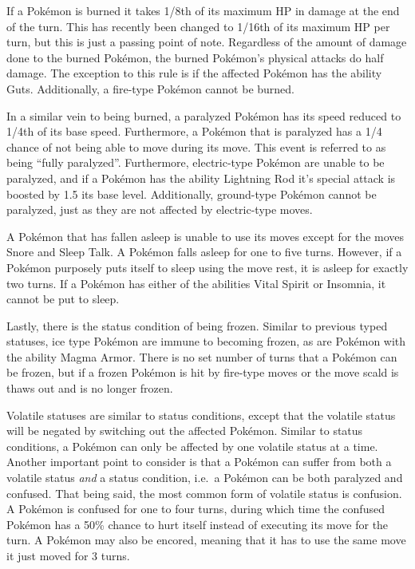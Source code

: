 \documentclass[12pt,twoside]{reedthesis}
\begin{document}
  If a Pokémon is burned it takes 1/8th of its maximum HP in damage at the
  end of the turn. This has recently been changed to 1/16th of its maximum
  HP per turn, but this is just a passing point of note. Regardless of the
  amount of damage done to the burned Pokémon, the burned Pokémon's
  physical attacks do half damage. The exception to this rule is if the
  affected Pokémon has the ability Guts. Additionally, a fire-type Pokémon
  cannot be burned.
  
  In a similar vein to being burned, a paralyzed Pokémon has its speed
  reduced to 1/4th of its base speed. Furthermore, a Pokémon that is
  paralyzed has a 1/4 chance of not being able to move during its move.
  This event is referred to as being ``fully paralyzed''. Furthermore,
  electric-type Pokémon are unable to be paralyzed, and if a Pokémon has
  the ability Lightning Rod it's special attack is boosted by 1.5 its base
  level. Additionally, ground-type Pokémon cannot be paralyzed, just as
  they are not affected by electric-type moves.
  
  A Pokémon that has fallen asleep is unable to use its moves except for
  the moves Snore and Sleep Talk. A Pokémon falls asleep for one to five
  turns. However, if a Pokémon purposely puts itself to sleep using the
  move rest, it is asleep for exactly two turns. If a Pokémon has either
  of the abilities Vital Spirit or Insomnia, it cannot be put to sleep.
  
  Lastly, there is the status condition of being frozen. Similar to
  previous typed statuses, ice type Pokémon are immune to becoming frozen,
  as are Pokémon with the ability Magma Armor. There is no set number of
  turns that a Pokémon can be frozen, but if a frozen Pokémon is hit by
  fire-type moves or the move scald is thaws out and is no longer frozen.
  
  Volatile statuses are similar to status conditions, except that the
  volatile status will be negated by switching out the affected Pokémon.
  Similar to status conditions, a Pokémon can only be affected by one
  volatile status at a time. Another important point to consider is that a
  Pokémon can suffer from both a volatile status \emph{and} a status
  condition, i.e.~a Pokémon can be both paralyzed and confused. That being
  said, the most common form of volatile status is confusion. A Pokémon is
  confused for one to four turns, during which time the confused Pokémon
  has a 50\% chance to hurt itself instead of executing its move for the
  turn. A Pokémon may also be encored, meaning that it has to use the same
  move it just moved for 3 turns.
  
\end{document}
